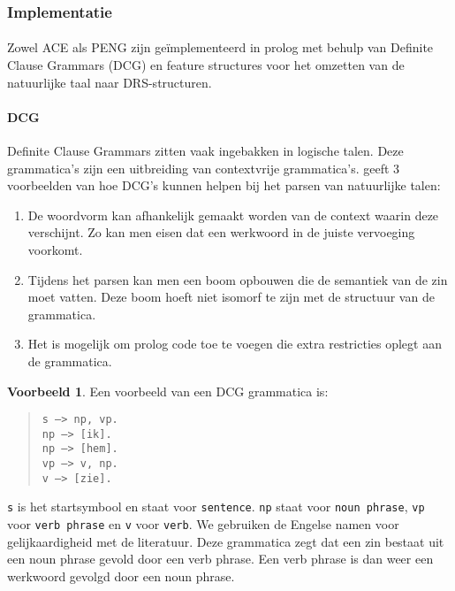 \documentclass[]{article}
\theoremstyle{definition}
\newtheorem{ex}{Voorbeeld}[section]
\begin{document}
\subsubsection{Implementatie}
\paragraph{} Zowel ACE als PENG zijn geïmplementeerd in prolog met behulp van Definite Clause Grammars (DCG) en feature structures voor het omzetten van de natuurlijke taal naar DRS-structuren\cite{Fuchs2008, Schwitter2006}.

\paragraph{DCG} Definite Clause Grammars\cite{Pereira1980} zitten vaak ingebakken in logische talen. Deze grammatica's zijn een uitbreiding van contextvrije grammatica's. \cite{Pereira1980} geeft 3 voorbeelden van hoe DCG's kunnen helpen bij het parsen van natuurlijke talen:

\begin{enumerate}
  \item De woordvorm kan afhankelijk gemaakt worden van de context waarin deze verschijnt. Zo kan men eisen dat een werkwoord in de juiste vervoeging voorkomt.
  \item Tijdens het parsen kan men een boom opbouwen die de semantiek van de zin moet vatten. Deze boom hoeft niet isomorf te zijn met de structuur van de grammatica.
  \item Het is mogelijk om prolog code toe te voegen die extra restricties oplegt aan de grammatica.
\end{enumerate}

\begin{ex}
  Een voorbeeld van een DCG grammatica is:
  \begin{quote}
    \texttt{s ---> np, vp.} \\
    \texttt{np ---> [ik].} \\
    \texttt{np ---> [hem].} \\
    \texttt{vp ---> v, np.} \\
    \texttt{v ---> [zie].}
  \end{quote}
\end{ex} 
\texttt{s} is het startsymbool en staat voor \texttt{sentence}. \texttt{np} staat voor \texttt{noun phrase}, \texttt{vp} voor \texttt{verb phrase} en \texttt{v} voor \texttt{verb}. We gebruiken de Engelse namen voor gelijkaardigheid met de literatuur. Deze grammatica zegt dat een zin bestaat uit een noun phrase gevold door een verb phrase. Een verb phrase is dan weer een werkwoord gevolgd door een noun phrase.
\end{document}
